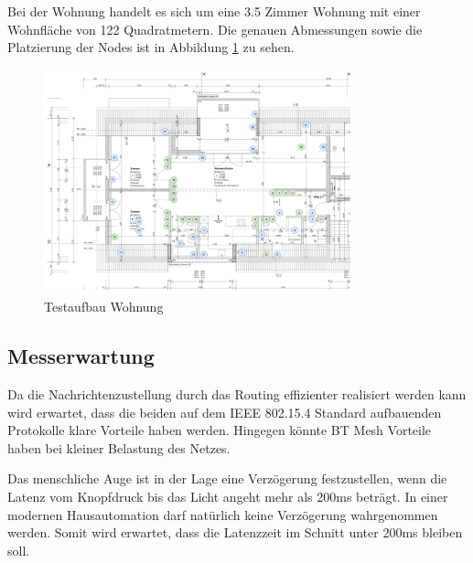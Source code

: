 Bei der Wohnung handelt es sich um eine 3.5 Zimmer Wohnung mit einer Wohnfläche von 122 Quadratmetern. Die genauen Abmessungen sowie die Platzierung der Nodes ist in Abbildung \ref{fig:TestaufbauWohnung} zu sehen.

\begin{figure}[h]
	\centering
	\includegraphics[width=0.8\textwidth]{graphics/Plan_Wohnung_Cyrill_Nodes_Placement.png}
	\caption{Testaufbau Wohnung}
	\label{fig:TestaufbauWohnung}
\end{figure}

\subsection{Messerwartung}
Da die Nachrichtenzustellung durch das Routing effizienter realisiert werden kann wird erwartet, dass die beiden auf dem IEEE 802.15.4 Standard aufbauenden Protokolle klare Vorteile haben werden. Hingegen könnte BT Mesh Vorteile haben bei kleiner Belastung des Netzes.

Das menschliche Auge ist in der Lage eine Verzögerung festzustellen, wenn die Latenz vom Knopfdruck bis das Licht angeht mehr als 200ms beträgt. In einer modernen Hausautomation darf natürlich keine Verzögerung wahrgenommen werden. Somit wird erwartet, dass die Latenzzeit im Schnitt unter 200ms bleiben soll. \cite{silicon_laboratories_inc_an1142_2020}
